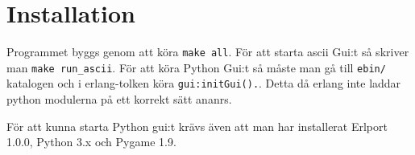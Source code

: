 
\chapter{Installation}

\label{Installation} 


Programmet byggs genom att köra \verb+make all+.
För att starta ascii Gui:t så skriver man \verb+make run_ascii+.
För att köra Python Gui:t så måste man gå till  \verb+ebin/+ katalogen och i erlang-tolken köra \verb+gui:initGui().+. Detta då erlang inte laddar python modulerna på ett korrekt sätt ananrs.

För att kunna starta Python gui:t krävs även att man har installerat Erlport 1.0.0, Python 3.x och Pygame 1.9.
